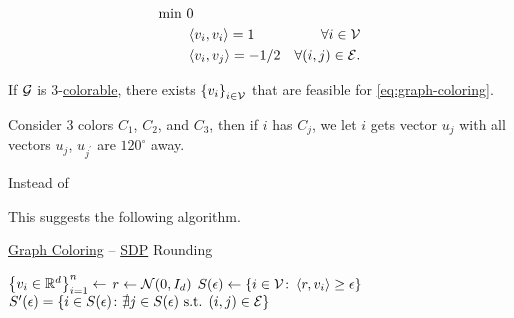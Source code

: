 \begin{equation}\label{eq:graph-coloring}
	\begin{aligned}
		\min~ & 0                                                                                             \\
		      & \left\langle v_i, v_i \right\rangle = 1      & \forall i\in \mathcal{\MakeUppercase{v}}       \\
		      & \left\langle v_i, v_j \right\rangle = -1 / 2 & \forall (i, j)\in \mathcal{\MakeUppercase{e}}.
	\end{aligned}
\end{equation}
\begin{claim}
	If \(\mathcal{\MakeUppercase{g}} \) is \(3\)-\hyperref[def:coloring]{colorable}, there exists \(\left\{ v_i \right\}_{i\in \mathcal{\MakeUppercase{v}} } \) that are feasible for \autoref{eq:graph-coloring}.
\end{claim}
\begin{explanation}
	Consider \(3\) colors \(C_1\), \(C_2\), and \(C_3\), then if \(i\) has \(C_j\), we let \(i\) gets vector \(u_j\) with all vectors \(u_j\), \(u_{j^\prime }\) are \(120^{\circ } \) away.
	\begin{center}
	\end{center}
\end{explanation}

Instead of

This suggests the following algorithm.

\begin{algorithm}[H]\label{algo:graph-coloring-SDP-rounding}
	\DontPrintSemicolon
	\caption{\hyperref[prb:graph-coloring]{Graph Coloring} -- \hyperref[def:SDP]{SDP} Rounding}
	\BlankLine
	\(\left\{ v_i \in \mathbb{\MakeUppercase{r}} ^d\right\} _{i=1}^n \gets\)\;
	\(r \gets \mathcal{\MakeUppercase{n}} (0, I_d)\)
	\(S(\epsilon )\gets\left\{ i\in \mathcal{\MakeUppercase{v}} \colon \left\langle r, v_i \right\rangle \geq \epsilon   \right\} \)
	\(S^\prime (\epsilon )= \left\{ i\in S(\epsilon )\colon \nexists j\in S(\epsilon ) \text{ s.t. } (i, j)\in \mathcal{\MakeUppercase{e}} \right\} \)\;
	\;
\end{algorithm}